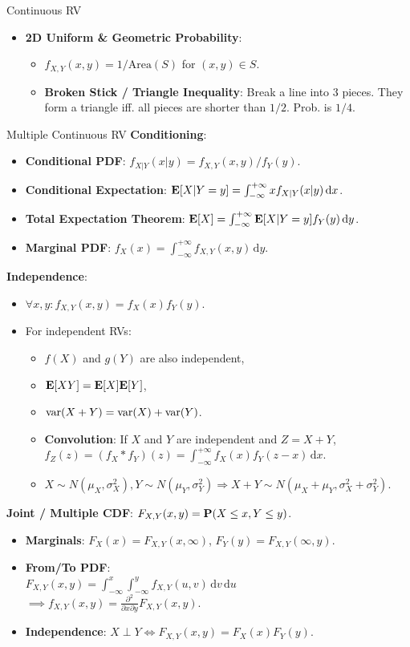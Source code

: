 \documentclass[landscape,a4paper]{article}
\begin{document}
\begin{cheatsheetcolumns}
\begin{card}{Continuous RV}
\begin{itemize}
				\item \textbf{2D Uniform \& Geometric Probability}:
				\begin{itemize}
					\item $f_{X,Y}(x,y) = 1/\text{Area}(S)$ for $(x,y) \in S$.
					\item \textbf{Broken Stick / Triangle Inequality}: Break a line into 3 pieces. They form a triangle iff. all pieces are shorter than $1/2$. Prob. is $1/4$.
				\end{itemize}
			\end{itemize}
		\end{card}
		\begin{card}{Multiple Continuous RV}
			\textbf{Conditioning}:
			\begin{itemize}
				\item \textbf{Conditional PDF}: $f_{X|Y}(x|y)=f_{X,Y}(x,y)/f_{Y}(y)$.
				\item \textbf{Conditional Expectation}: $\mathbf{E}[X|Y=y]=\int_{-\infty}^{+\infty}xf_{X|Y}(x|y)\,\mathrm dx$.
				\item \textbf{Total Expectation Theorem}: $\mathbf{E}[X]=\int_{-\infty}^{+\infty}\mathbf{E}[X|Y=y]f_Y(y)\,\mathrm dy$.
				\item \textbf{Marginal PDF}: $f_X(x)=\int_{-\infty}^{+\infty} f_{X,Y}(x,y)\,\mathrm dy$.
			\end{itemize}
			\textbf{Independence}:
			\begin{itemize}
				\item $\forall x,y\colon f_{X,Y}(x,y)=f_X(x)f_Y(y)$.
				\item For independent RVs:
				\begin{itemize}
					\item $f(X)$ and $g(Y)$ are also independent,
					\item $\mathbf{E}[XY]=\mathbf{E}[X]\mathbf{E}[Y]$,
					\item $\operatorname{var}(X+Y)=\operatorname{var}(X)+\operatorname{var}(Y)$.
					\item \textbf{Convolution}: If $X$ and $Y$ are independent and $Z=X+Y$, $f_Z(z)=(f_X\ast f_Y)(z)=\int_{-\infty}^{+\infty}f_X(x)f_Y(z-x)\,\mathrm dx$.
					\item $X\sim N(\mu_X,\sigma_X^2),Y\sim N(\mu_Y,\sigma_Y^2)\Rightarrow X+Y\sim N(\mu_X+\mu_Y,\sigma_X^2+\sigma_Y^2)$.
				\end{itemize}
			\end{itemize}
			\textbf{Joint / Multiple CDF}: $F_{X,Y}(x,y) = \mathbf{P}(X \le x, Y \le y)$.
			\begin{itemize}
				\item \textbf{Marginals}: $F_X(x) = F_{X,Y}(x, \infty)$, $F_Y(y) = F_{X,Y}(\infty, y)$.
				\item \textbf{From/To PDF}:\\$F_{X,Y}(x,y) = \int_{-\infty}^{x} \int_{-\infty}^{y} f_{X,Y}(u,v)\,\mathrm dv\,\mathrm du $\\$\implies f_{X,Y}(x,y) = \frac{\partial^2}{\partial x \partial y} F_{X,Y}(x,y)$.
				\item \textbf{Independence}: $X \perp Y \iff F_{X,Y}(x,y) = F_X(x)F_Y(y)$.
			\end{itemize}
			

\end{card}
\end{cheatsheetcolumns}
\end{document}
